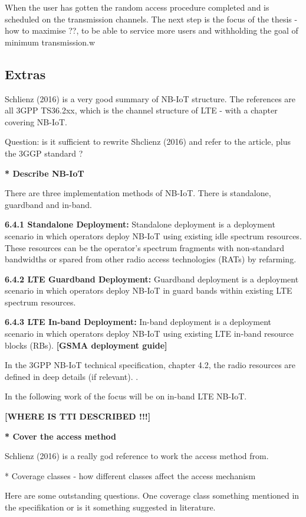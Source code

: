 \documentclass[10pt,a4paper,titlepage,twoside]{article}
\newcommand{\tilv}[1]{\textbf{\color{ymagreen} [#1]}}
\newcommand{\note}[1]{\textbf{\color{ymagray}[#1]}}
\newcommand{\point}[1]{\textbf{\color{ymared} #1}}
\begin{document}
When the user has gotten the random access procedure completed and is scheduled on the transmission channels. The next step is the focus of the thesis - how to maximise ??, to be able to service more users and withholding the goal of minimum transmission.w


\subsection{Extras}

Schlienz (2016) \cite{schlienz} is a very good summary of NB-IoT structure. The references are all 3GPP TS36.2xx, which is the channel structure of LTE - with a chapter covering NB-IoT.

Question: is it sufficient to rewrite Shclienz (2016) and refer to the article, plus the 3GGP standard ?

\point{* Describe NB-IoT}

There are three implementation methods of NB-IoT. There is standalone, guardband and in-band.

\textbf{6.4.1 Standalone Deployment:}
Standalone deployment is a deployment scenario in which operators deploy NB-IoT using
existing idle spectrum resources. These resources can be the operator’s spectrum
fragments with non-standard bandwidths or spared from other radio access technologies
(RATs) by refarming.

\textbf{6.4.2 LTE Guardband Deployment:}
Guardband deployment is a deployment scenario in which operators deploy NB-IoT in guard
bands within existing LTE spectrum resources.

\textbf{6.4.3 LTE In-band Deployment:}
In-band deployment is a deployment scenario in which operators deploy NB-IoT using
existing LTE in-band resource blocks (RBs).
\tilv{GSMA deployment guide}


In the 3GPP NB-IoT technical specification, chapter 4.2, the radio resources are defined in deep details (if relevant).
\cite{schlienz}.

In the following work of the focus will be on in-band LTE NB-IoT.

\note{WHERE IS TTI DESCRIBED !!!}

\point{* Cover the access method}

Schlienz (2016) is a really god reference to work the access method from.

* Coverage classes - how different classes affect the access mechanism

Here are some outstanding questions. One coverage class something mentioned in the specifikation or is it something suggested in literature.
\end{document}
